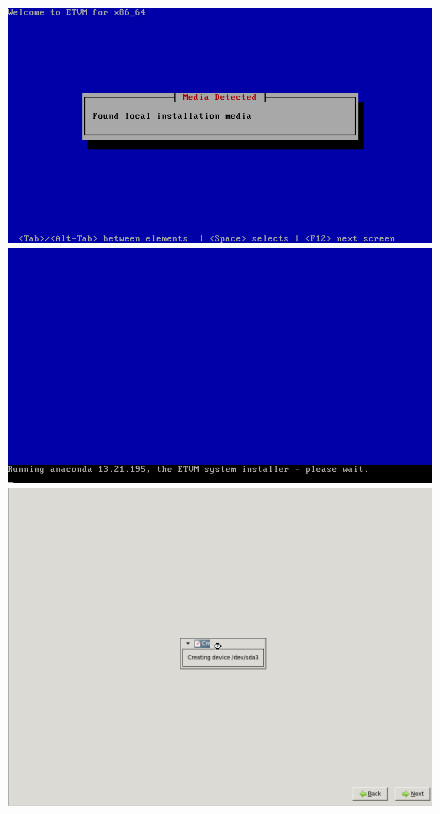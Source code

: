 \begin{figure}[H]
	\begin{center}
	\includegraphics[scale=0.3]{screenshots/install/unitbox/load_installer_01.png}
	\includegraphics[scale=0.3]{screenshots/install/unitbox/load_installer_02.png}
	\includegraphics[scale=0.2]{screenshots/install/unitbox/format_disks_01.png}

\end{center}
\end{figure}
